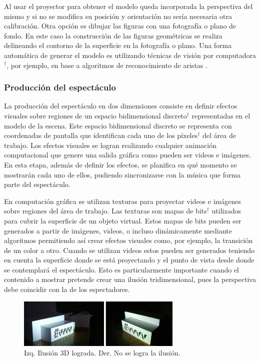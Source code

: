 \begin{itemize}
Al usar el proyector para obtener el modelo queda incorporada la perspectiva del mismo y si no se modifica su posición y orientación no sería necesaria otra calibración.
Otra opción es dibujar las figuras con una fotografía o plano de fondo. En este caso la construcción de las figuras geométricas se realiza delineando el contorno de la superficie en la fotografía o plano.
Una forma automática de generar el modelo es utilizando técnicas de visión por computadora$^\dagger$, por ejemplo, en base a algoritmos de reconocimiento de aristas \cite{ArticuloAutom2dmodel}.
\end{itemize}

\subsubsection{Producción del espectáculo}
La producción del espectáculo en dos dimensiones consiste en definir efectos visuales sobre regiones de un espacio bidimensional discreto$^\dagger$ representadas en el modelo de la escena. Este espacio bidimensional discreto se representa con coordenadas de pantalla que identifican cada uno de los píxeles$^\dagger$ del área de trabajo. Los efectos visuales se logran realizando cualquier animación computacional que genere una salida gráfica como pueden ser videos e imágenes.
En esta etapa, además de definir los efectos, se planifica en qué momento se mostrarán cada uno de ellos, pudiendo sincronizarse con la música que forma parte del espectáculo.

En computación gráfica se utilizan texturas para proyectar videos e imágenes sobre regiones del área de trabajo. Las texturas son mapas de bits$^\dagger$ utilizados para cubrir la superficie de un objeto virtual. Estos mapas de bits pueden ser generados a partir de imágenes, videos, o incluso dinámicamente mediante algoritmos permitiendo así crear efectos visuales como, por ejemplo, la transición de un color a otro.
Cuando se utilizan videos estos pueden ser generados teniendo en cuenta la superficie donde se está proyectando y el punto de vista desde donde se contemplará el espectáculo. Esto es particularmente importante cuando el contenido a mostrar pretende crear una ilusión tridimensional, pues la perspectiva debe coincidir con la de los espectadores.%
\begin{figure}[H]
  \centering
    \includegraphics[width=0.7\textwidth]{./Cap2_videomapping/3dillusion}
  \caption{Izq. Ilusión 3D lograda. Der. No se logra la ilusión.}%
  \label{fig:3dillusion}
\end{figure}

